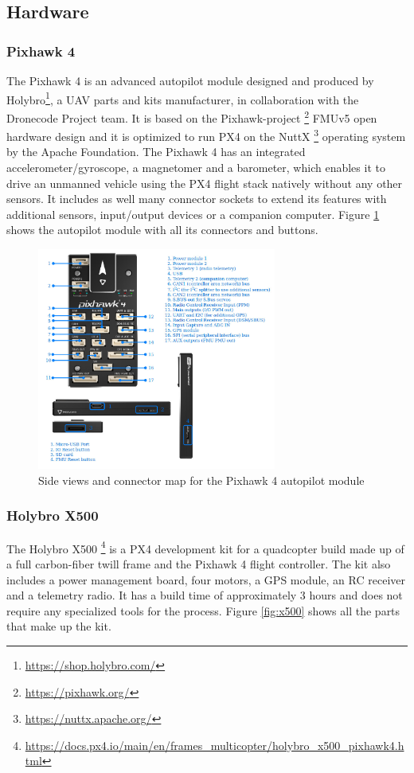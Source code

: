 \subsection{Hardware}
\subsubsection{Pixhawk 4}
\label{subsec:pixhawk}
The Pixhawk 4 is an advanced autopilot module designed and produced by Holybro\footnote{\url{https://shop.holybro.com/}}, a UAV parts and kits manufacturer, in collaboration with the Dronecode Project team.
It is based on the Pixhawk-project \footnote{\url{https://pixhawk.org/}} FMUv5 open hardware design and it is optimized to run PX4 on the NuttX \footnote{\url{https://nuttx.apache.org/}} operating system by the Apache Foundation.
The Pixhawk 4 has an integrated accelerometer/gyroscope, a magnetomer and a barometer, which enables it to drive an unmanned vehicle using the PX4 flight stack natively without any other sensors.
It includes as well many connector sockets to extend its features with additional sensors, input/output devices or a companion computer.
Figure \ref{fig:pixhawk4} shows the autopilot module with all its connectors and buttons.

\begin{figure}
  \centering
  \includegraphics[width=0.7\textwidth,keepaspectratio]{img/pixhawk4.jpg}
  \caption{Side views and connector map for the Pixhawk 4 autopilot module}\label{fig:pixhawk4}
\end{figure}


\subsubsection{Holybro X500}
\label{subsec:x500}
The Holybro X500 \footnote{\url{https://docs.px4.io/main/en/frames_multicopter/holybro_x500_pixhawk4.html}} is a PX4 development kit for a quadcopter build made up of a full carbon-fiber twill frame and the Pixhawk 4 flight controller.
The kit also includes a power management board, four motors, a GPS module, an RC receiver and a telemetry radio.
It has a build time of approximately 3 hours and does not require any specialized tools for the process.
Figure \ref{fig:x500} shows all the parts that make up the kit.

